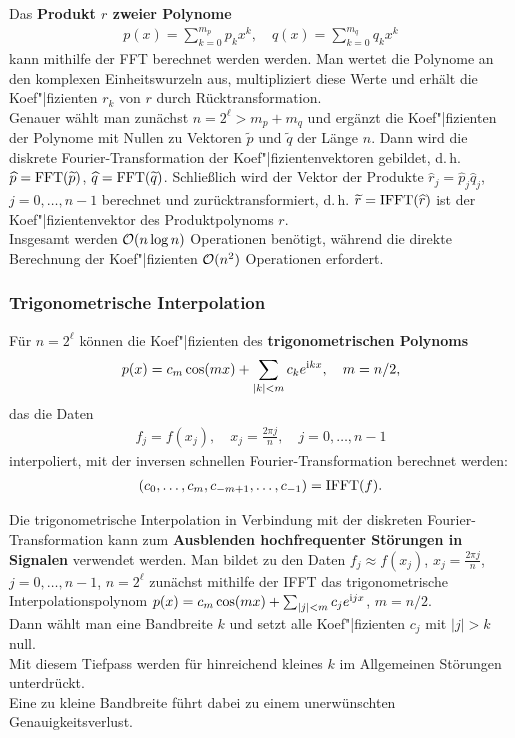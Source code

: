 \linie

Das \textbf{Produkt $r$ zweier Polynome}
\begin{align*}
    p(x) = \sum_{k=0}^{m_p} p_k x^k, \quad
    q(x) = \sum_{k=0}^{m_q} q_k x^k
\end{align*}
kann mithilfe der FFT berechnet werden werden.
Man wertet die Polynome an den komplexen Einheitswurzeln aus,
multipliziert diese Werte und erhält die Koef"|fizienten $r_k$ von $r$
durch Rücktransformation. \\
Genauer wählt man zunächst $n = 2^\ell > m_p + m_q$ und ergänzt die
Koef"|fizienten der Polynome mit Nullen zu Vektoren $\widetilde{p}$ und
$\widetilde{q}$ der Länge $n$.
Dann wird die diskrete Fourier-Transformation der Koef"|fizientenvektoren
gebildet, d.\,h. $\widehat{p} = \operatorname{FFT}(\widetilde{p})$,
$\widehat{q} = \operatorname{FFT}(\widetilde{q})$.
Schließlich wird der Vektor der Produkte
$\widehat{r}_j = \widehat{p}_j \widehat{q}_j$, $j = 0, \dotsc, n - 1$
berechnet und zurücktransformiert, d.\,h.
$\widetilde{r} = \operatorname{IFFT}(\widehat{r})$ ist der Koef"|fizientenvektor des
Produktpolynoms $r$. \\
Insgesamt werden $\mathcal{O}(n \log n)$ Operationen benötigt, während die
direkte Berechnung der Koef"|fizienten $\mathcal{O}(n^2)$ Operationen erfordert.

\subsubsection{%
    Trigonometrische Interpolation%
}

Für $n = 2^\ell$ können die Koef"|fizienten des
\textbf{trigonometrischen Polynoms}
\begin{align*}
    p(x) = c_m \cos(mx) + \sum_{|k| < m} c_k e^{\mathrm{i} k x}, \quad
    m = n/2,
\end{align*}
das die Daten
\begin{align*}
    f_j = f(x_j), \quad
    x_j = \frac{2\pi j}{n}, \quad
    j = 0, \dotsc, n - 1
\end{align*}
interpoliert, mit der inversen schnellen Fourier-Transformation berechnet
werden:
\begin{align*}
    (c_0, \dotsc, c_m, c_{-m+1}, \dotsc, c_{-1}) = \operatorname{IFFT}(f).
\end{align*}

\linie

Die trigonometrische Interpolation in Verbindung mit der diskreten
Fourier-Transformation kann zum
\textbf{Ausblenden hochfrequenter Störungen in Signalen} verwendet werden.
Man bildet zu den Daten $f_j \approx f(x_j)$, $x_j = \frac{2\pi j}{n}$,
$j = 0, \dotsc, n - 1$, $n = 2^\ell$ zunächst mithilfe der IFFT das
trigonometrische Interpolationspolynom
$p(x) = c_m \cos(mx) + \sum_{|j| < m} c_j e^{\mathrm{i} j x}$, $m = n/2$. \\
Dann wählt man eine Bandbreite $k$ und setzt alle Koef"|fizienten $c_j$
mit $|j| > k$ null. \\
Mit diesem Tiefpass werden für hinreichend kleines $k$ im Allgemeinen
Störungen unterdrückt. \\
Eine zu kleine Bandbreite führt dabei zu einem unerwünschten
Genauigkeitsverlust.

